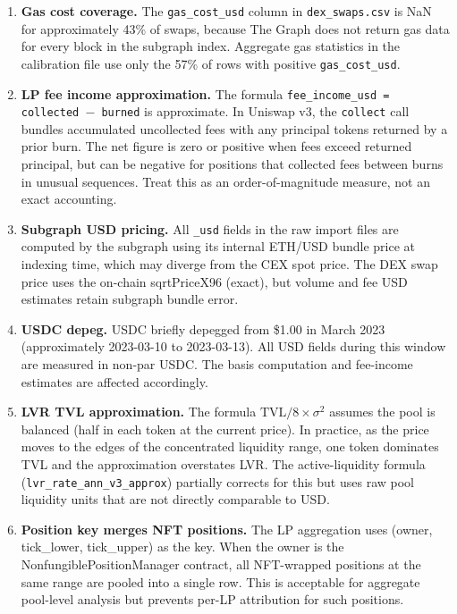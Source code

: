 \documentclass[11pt,a4paper]{article}
\begin{document}
\begin{enumerate}
  \item \textbf{Gas cost coverage.} The \texttt{gas\_cost\_usd} column
        in \texttt{dex\_swaps.csv} is NaN for approximately 43\% of
        swaps, because The Graph does not return gas data for every block
        in the subgraph index. Aggregate gas statistics in the calibration
        file use only the 57\% of rows with positive \texttt{gas\_cost\_usd}.

  \item \textbf{LP fee income approximation.} The formula
        \texttt{fee\_income\_usd = collected $-$ burned} is approximate.
        In Uniswap v3, the \texttt{collect} call bundles accumulated
        uncollected fees with any principal tokens returned by a prior
        burn. The net figure is zero or positive when fees exceed returned
        principal, but can be negative for positions that collected fees
        between burns in unusual sequences. Treat this as an order-of-magnitude
        measure, not an exact accounting.

  \item \textbf{Subgraph USD pricing.} All \texttt{\_usd} fields in the
        raw import files are computed by the subgraph using its internal
        ETH/USD bundle price at indexing time, which may diverge from the
        CEX spot price. The DEX swap price uses the on-chain sqrtPriceX96
        (exact), but volume and fee USD estimates retain subgraph bundle
        error.

  \item \textbf{USDC depeg.} USDC briefly depegged from \$1.00 in March
        2023 (approximately 2023-03-10 to 2023-03-13). All USD fields
        during this window are measured in non-par USDC. The basis
        computation and fee-income estimates are affected accordingly.

  \item \textbf{LVR TVL approximation.} The formula $\mathrm{TVL}/8 \times
        \sigma^2$ assumes the pool is balanced (half in each token at the
        current price). In practice, as the price moves to the edges of
        the concentrated liquidity range, one token dominates TVL and the
        approximation overstates LVR. The active-liquidity formula
        (\texttt{lvr\_rate\_ann\_v3\_approx}) partially corrects for this
        but uses raw pool liquidity units that are not directly comparable
        to USD.

  \item \textbf{Position key merges NFT positions.} The LP aggregation
        uses (owner, tick\_lower, tick\_upper) as the key. When the owner
        is the NonfungiblePositionManager contract, all NFT-wrapped
        positions at the same range are pooled into a single row. This is
        acceptable for aggregate pool-level analysis but prevents per-LP
        attribution for such positions.


\end{enumerate}
\end{document}
